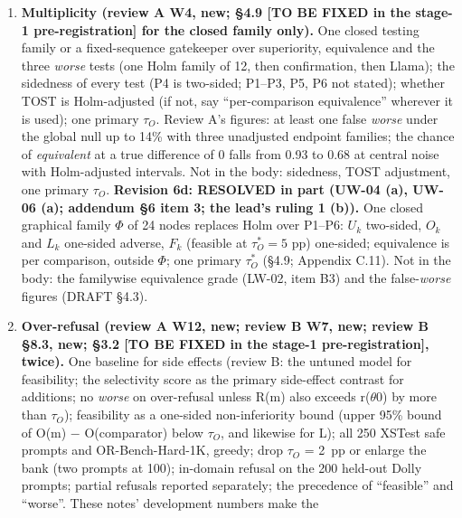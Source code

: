 \documentclass{article}
\theoremstyle{plain}
\theoremstyle{definition}
\theoremstyle{remark}
\begin{document}
\begin{enumerate}
        references on fresh seeds (review B). Revision 6's ``lower F than the
        curve at equal O and L'' is not defined on a one-dimensional curve (both
        reviews).
  \item \textbf{Multiplicity (review A W4, new; \S{}4.9 [TO BE FIXED in the
        stage-1 pre-registration] for the closed family only).} One closed
        testing family or a fixed-sequence gatekeeper over superiority,
        equivalence and the three \emph{worse} tests (one Holm family of 12,
        then confirmation, then Llama); the sidedness of every test (P4 is
        two-sided; P1--P3, P5, P6 not stated); whether TOST is Holm-adjusted (if
        not, say ``per-comparison equivalence'' wherever it is used); one
        primary $\tau_{O}$. Review A's figures: at least one false \emph{worse}
        under the global null up to 14\% with three unadjusted endpoint
        families; the chance of \emph{equivalent} at a true difference of 0
        falls from 0.93 to 0.68 at central noise with Holm-adjusted intervals.
        Not in the body: sidedness, TOST adjustment, one primary $\tau_{O}$.
        \textbf{Revision 6d: RESOLVED in part (UW-04 (a), UW-06 (a); addendum
        \S{}6 item 3; the lead's ruling 1 (b)).} One closed graphical family
        $\Phi$ of 24 nodes replaces Holm over P1--P6: $U_k$ two-sided, $O_k$ and
        $L_k$ one-sided adverse, $F_k$ (feasible at $\tau_O^* = 5$ pp)
        one-sided; equivalence is per comparison, outside $\Phi$; one primary
        $\tau_O^*$ (\S{}4.9; Appendix C.11). Not in the body: the familywise
        equivalence grade (LW-02, item B3) and the false-\emph{worse} figures
        (DRAFT \S{}4.3).
  \item \textbf{Over-refusal (review A W12, new; review B W7, new; review B
        \S{}8.3, new; \S{}3.2 [TO BE FIXED in the stage-1 pre-registration],
        twice).} One baseline for side effects (review B: the untuned model for
        feasibility; the selectivity score as the primary side-effect contrast
        for additions; no \emph{worse} on over-refusal unless R(m) also exceeds
        r($\theta$0) by more than $\tau_{O}$); feasibility as a one-sided
        non-inferiority bound (upper 95\% bound of O(m) $-$ O(comparator) below
        $\tau_{O}$, and likewise for L); all 250 XSTest safe prompts and
        OR-Bench-Hard-1K, greedy; drop $\tau_{O}$ = 2~pp or enlarge the bank
        (two prompts at 100); in-domain refusal on the 200 held-out Dolly
        prompts; partial refusals reported separately; the precedence of
        ``feasible'' and ``worse''. These notes' development numbers make the

\end{enumerate}
\end{document}
